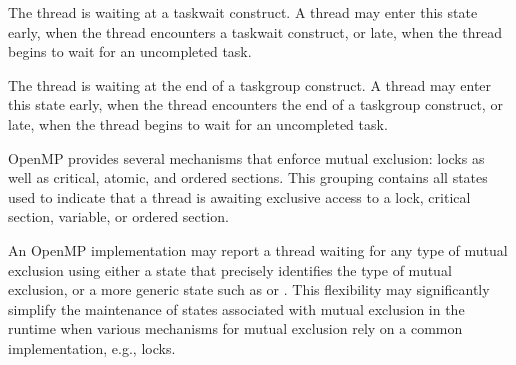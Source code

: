 
\begin{description}

\item {}

  The thread is waiting at a taskwait construct. A
  thread may enter this state early, when the
  thread encounters a taskwait construct, or late, when the thread
  begins to wait for an uncompleted task.

\item {}

  The thread is waiting at the end of a taskgroup construct. A
  thread may enter this state early, when the
  thread encounters the end of a taskgroup construct, or late, when the thread
  begins to wait for an uncompleted task.

\end{description}



OpenMP provides several mechanisms that enforce mutual exclusion:
locks as well as critical, atomic, and ordered sections.  This
grouping contains all states used to indicate that a thread is
awaiting exclusive access to a lock, critical section, variable,
or ordered section.

An OpenMP implementation may report a thread waiting for any type
of mutual exclusion using either a state that precisely identifies
the type of mutual exclusion, or  a more generic state such as
 or .  This
flexibility may significantly simplify the maintenance of states
associated with mutual exclusion in the runtime when various
mechanisms for mutual exclusion rely on a common implementation,
e.g., locks.


